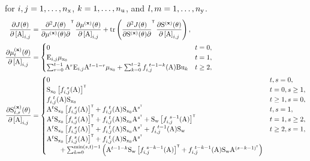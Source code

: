 for $i,j=1,\ldots,n_{ \mathrm{x} }$, $k = 1,\ldots,n_{ \mathrm{u} }$, and $l,m=1,\ldots,n_{ \mathrm{y} }$.
\iffalse
\begin{align}
        \pdv{J(\vctheta)}{\left[ \mxA \right]_{i,j}} &= \pdv{J(\vctheta)}{\mu^{(\mathbf{x})}(\vctheta)}{}^\tr\, \pdv{\mu^{(\mathbf{x})}(\vctheta)}{\left[\mxA \right]_{i,j}} 
        + 
        \trace\left(\pdv{J(\vctheta)}{\mxS^{(\mathbf{x})}(\vctheta)}{}^\tr\, \pdv{\mxS^{(\mathbf{x})}(\vctheta)}{\left[ \mxA \right]_{i,j}} \right), 
        \label{eq:J derivative A1}\\
        \pdv{\mu^{(\mathbf{x})}_t(\vctheta)}{\left[\mxA \right]_{i,j}} &= \begin{cases}
            0 & t=0,\\
            \mxE_{i,j} \mu_{\vcx_0} & t=1,\\
            \sum_{r=0}^{t-1} \mxA^{r}\mxE_{i,j}\mxA^{t-1-r}\mu_{\vcx_0} + \sum_{k=0}^{t-2}f_{i,j}^{\ t-1-k}(\mxA)\mxB\vcu_k& t\geq2,
        \end{cases}\label{eq:J derivative A2}\\
        \pdv{\mxS^{(\mathbf{x})}_{t,s}(\vctheta)}{\left[ \mxA \right]_{i,j}} &= \begin{cases}
            0 & t,s=0,\\
            \mxS_{\vcx_0}\left[ f^{\ s}_{i,j}(\mxA) \right]^\tr & t=0,s\geq 1,\\
            f^{\ t}_{i,j}(\mxA)\mxS_{\vcx_0} & t \geq 1, s=0,\\
            \mxA^{t}\mxS_{\vcx_0} \left[ f^{\ s}_{i,j}(\mxA)\right]^\tr + f^{\ t}_{i,j}(\mxA)\mxS_{\vcx_0}\mxA^{s^\tr}  &
             t,s=1,\\
            \mxA^{t}\mxS_{\vcx_0} \left[ f^{\ s}_{i,j}(\mxA)\right]^\tr + f^{\ t}_{i,j}(\mxA)\mxS_{\vcx_0}\mxA^{s^\tr} + \mxS_\vcw \left[ f_{i,j}^{\ s-1}(\mxA) \right]^\tr &
             t=1,s\geq 2,\\
            \mxA^{t}\mxS_{\vcx_0} \left[ f^{\ s}_{i,j}(\mxA)\right]^\tr + f^{\ t}_{i,j}(\mxA)\mxS_{\vcx_0}\mxA^{s^\tr} + f_{i,j}^{\ t-1}(\mxA) \mxS_\vcw  &
             t \geq 2,s = 1,\\
            \mxA^{t}\mxS_{\vcx_0} \left[ f^{\ s}_{i,j}(\mxA)\right]^\tr + f^{\ t}_{i,j}(\mxA)\mxS_{\vcx_0}\mxA^{s^\tr} &\\
            \qquad+ \sum_{k=0}^{\min (s,t)-1} \left( \mxA^{t-1-k}\mxS_\vcw \left[ f_{i,j}^{\ s-k-1}(\mxA) \right]^\tr + f_{i,j}^{\ t-k-1}(\mxA)  \mxS_\vcw \mxA^{(s-k-1)^\tr}  \right) &

\end{cases}
\end{align}
